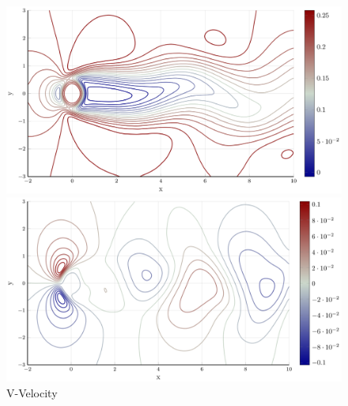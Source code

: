\documentclass{article}
\begin{document}
\begin{figure}[ht]
\vskip 0.2in
\begin{subfigure}
  \begin{center}
  \centerline{\includegraphics[width=\columnwidth]{figures/uvel.svg}}
  \caption{X-Velocity}
  \label{xvelocity}
  \end{center}
\end{subfigure}

\begin{subfigure}
  \begin{center}
  \centerline{\includegraphics[width=\columnwidth]{figures/vvel.svg}}
  \caption{V-Velocity}
  \label{yvelocity}
  \end{center}
\end{subfigure}


\end{figure}
\end{document}
